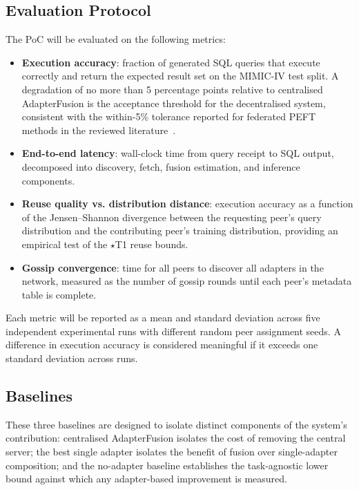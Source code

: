 \subsection{Evaluation Protocol}
\label{sec:poc:evaluation}

The PoC will be evaluated on the following metrics:

\begin{itemize}
\item \textbf{Execution accuracy}: fraction of generated SQL queries that execute
    correctly and return the expected result set on the MIMIC-IV test split. A 
    degradation of no more than 5 percentage points relative to centralised 
    AdapterFusion is the acceptance threshold for the decentralised system, 
    consistent with the within-5\% tolerance reported for federated PEFT 
    methods in the reviewed literature~\citep{ZhangFedPETuning2023}.
  \item \textbf{End-to-end latency}: wall-clock time from query receipt to SQL output,
    decomposed into discovery, fetch, fusion estimation, and inference components.
  \item \textbf{Reuse quality vs. distribution distance}: execution accuracy as a
    function of the Jensen--Shannon divergence between the requesting peer's query
    distribution and the contributing peer's training distribution, providing an
    empirical test of the $\star$T1 reuse bounds.
  \item \textbf{Gossip convergence}: time for all peers to discover all adapters in
    the network, measured as the number of gossip rounds until each peer's metadata
    table is complete.
\end{itemize}

Each metric will be reported as a mean and standard deviation across five 
independent experimental runs with different random peer assignment seeds. 
A difference in execution accuracy is considered meaningful if it exceeds 
one standard deviation across runs.

\subsection{Baselines}
\label{sec:poc:baselines}

These three baselines are designed to isolate distinct components of the 
system's contribution: centralised AdapterFusion isolates the cost of 
removing the central server; the best single adapter isolates the benefit 
of fusion over single-adapter composition; and the no-adapter baseline 
establishes the task-agnostic lower bound against which any adapter-based 
improvement is measured.

